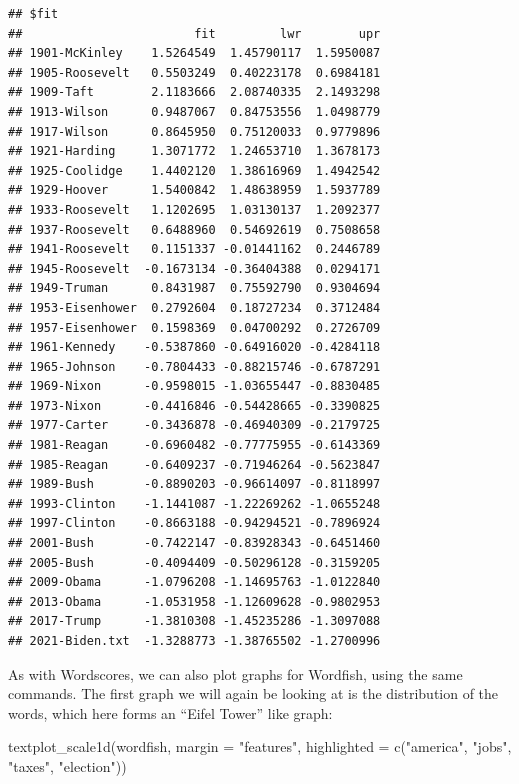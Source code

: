 \documentclass[
]{book}
\newenvironment{Shaded}{\begin{snugshade}}{\end{snugshade}}
\newcommand{\AttributeTok}[1]{\textcolor[rgb]{0.77,0.63,0.00}{#1}}
\newcommand{\FunctionTok}[1]{\textcolor[rgb]{0.00,0.00,0.00}{#1}}
\newcommand{\NormalTok}[1]{#1}
\newcommand{\StringTok}[1]{\textcolor[rgb]{0.31,0.60,0.02}{#1}}
\begin{document}
\begin{verbatim}
## $fit
##                        fit         lwr        upr
## 1901-McKinley    1.5264549  1.45790117  1.5950087
## 1905-Roosevelt   0.5503249  0.40223178  0.6984181
## 1909-Taft        2.1183666  2.08740335  2.1493298
## 1913-Wilson      0.9487067  0.84753556  1.0498779
## 1917-Wilson      0.8645950  0.75120033  0.9779896
## 1921-Harding     1.3071772  1.24653710  1.3678173
## 1925-Coolidge    1.4402120  1.38616969  1.4942542
## 1929-Hoover      1.5400842  1.48638959  1.5937789
## 1933-Roosevelt   1.1202695  1.03130137  1.2092377
## 1937-Roosevelt   0.6488960  0.54692619  0.7508658
## 1941-Roosevelt   0.1151337 -0.01441162  0.2446789
## 1945-Roosevelt  -0.1673134 -0.36404388  0.0294171
## 1949-Truman      0.8431987  0.75592790  0.9304694
## 1953-Eisenhower  0.2792604  0.18727234  0.3712484
## 1957-Eisenhower  0.1598369  0.04700292  0.2726709
## 1961-Kennedy    -0.5387860 -0.64916020 -0.4284118
## 1965-Johnson    -0.7804433 -0.88215746 -0.6787291
## 1969-Nixon      -0.9598015 -1.03655447 -0.8830485
## 1973-Nixon      -0.4416846 -0.54428665 -0.3390825
## 1977-Carter     -0.3436878 -0.46940309 -0.2179725
## 1981-Reagan     -0.6960482 -0.77775955 -0.6143369
## 1985-Reagan     -0.6409237 -0.71946264 -0.5623847
## 1989-Bush       -0.8890203 -0.96614097 -0.8118997
## 1993-Clinton    -1.1441087 -1.22269262 -1.0655248
## 1997-Clinton    -0.8663188 -0.94294521 -0.7896924
## 2001-Bush       -0.7422147 -0.83928343 -0.6451460
## 2005-Bush       -0.4094409 -0.50296128 -0.3159205
## 2009-Obama      -1.0796208 -1.14695763 -1.0122840
## 2013-Obama      -1.0531958 -1.12609628 -0.9802953
## 2017-Trump      -1.3810308 -1.45235286 -1.3097088
## 2021-Biden.txt  -1.3288773 -1.38765502 -1.2700996
\end{verbatim}

As with Wordscores, we can also plot graphs for Wordfish, using the same commands. The first graph we will again be looking at is the distribution of the words, which here forms an ``Eifel Tower'' like graph:

\begin{Shaded}
\begin{Highlighting}[]
\FunctionTok{textplot\_scale1d}\NormalTok{(wordfish, }\AttributeTok{margin =} \StringTok{"features"}\NormalTok{, }\AttributeTok{highlighted =} \FunctionTok{c}\NormalTok{(}\StringTok{"america"}\NormalTok{,}
    \StringTok{"jobs"}\NormalTok{, }\StringTok{"taxes"}\NormalTok{, }\StringTok{"election"}\NormalTok{))}
\end{Highlighting}
\end{Shaded}
\end{document}
